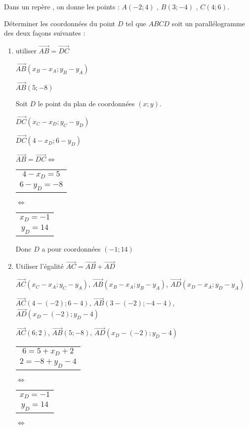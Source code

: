 
Dans un repère \Oij, on donne les points :	$A(-2;4)$ , $B(3;-4)$ , $C(4;6)$.

Déterminer les coordonnées du point $D$ tel que $ABCD$ soit un parallélogramme des deux façons suivantes :
\begin{enumerate}
\item utiliser $\overrightarrow{AB}=\overrightarrow{DC}$

$\overrightarrow{AB} (x_B-x_A;y_B-y_A)$

$\overrightarrow{AB} (5;-8)$

Soit $D$ le point du plan de coordonnées $(x;y)$.

$\overrightarrow{DC} (x_C-x_D;y_C-y_D)$

$\overrightarrow{DC} (4-x_D;6-y_D)$


$\overrightarrow{AB}=\overrightarrow{DC} \Longleftrightarrow $ \begin{tabular}{c}
$4-x_D = 5$ \\ 
$6-y_D = -8$ \\ 
\end{tabular} 

$\Longleftrightarrow $ \begin{tabular}{c}
$x_D = -1$ \\ 
$y_D = 14$ \\ 
\end{tabular} 

Donc $D$ a pour coordonnées $(-1;14)$

\item Utiliser l'égalité $\overrightarrow{AC}=\overrightarrow{AB}+\overrightarrow{AD}$

$\overrightarrow{AC}(x_C-x_A;y_C-y_A)$, $\overrightarrow{AB}(x_B-x_A;y_B-y_A)$, $\overrightarrow{AD}(x_D-x_A;y_D-y_A)$

$\overrightarrow{AC}(4-(-2);6-4)$, $\overrightarrow{AB}(3-(-2);-4-4)$, $\overrightarrow{AD}(x_D-(-2);y_D-4)$

$\overrightarrow{AC}(6;2)$, $\overrightarrow{AB}(5;-8)$, $\overrightarrow{AD}(x_D-(-2);y_D-4)$


\begin{tabular}{c}
$6=5+x_D+2 $ \\ 
$2=-8+y_D-4  $ \\ 
\end{tabular} $\Longleftrightarrow $
\begin{tabular}{c}
$x_D = -1$ \\ 
$y_D = 14$ \\ 
\end{tabular}$\Longleftrightarrow $




\end{enumerate}